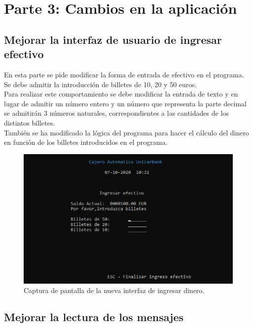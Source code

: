 \documentclass[10pt,a4paper]{article}
\begin{document}
\section{Parte 3: Cambios en la aplicación}

\subsection{Mejorar la interfaz de usuario de ingresar efectivo}

En esta parte se pide modificar la forma de entrada de efectivo en el programa. Se debe admitir la introducción de billetes de 10, 20 y 50 euros.\\
Para realizar este comportamiento se debe modificar la entrada de texto y en lugar de admitir un número entero y un número que representa la parte decimal se admitirán 3 números naturales, correspondientes a las cantidades de los distintos billetes.\\

También se ha modificado la lógica del programa para hacer el cálculo del dinero en función de los billetes introducidos en el programa.\\

\begin{figure}[h!]
\centering
\includegraphics[scale=0.75]{images/pantalla_ingreso.png}
\caption{Captura de pantalla de la nueva interfaz de ingresar dinero.}
\label{fig:pantalla_ingreso}
\end{figure}



\subsection{Mejorar la lectura de los mensajes}
\end{document}
